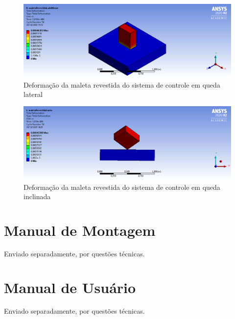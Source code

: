 \begin{apendicesenv}
\begin{figure}[htb]
    \centering
    \includegraphics[width=1.0\textwidth, angle=0]{figuras/estrutura_simulacaoImpacto/maletaRevestidaDeformacaoMenor.png}
    \caption{Deformação da maleta revestida do sistema de controle em queda lateral}
    \label{fig:simulacaoImpacto_35}
\end{figure}

\begin{figure}[htb]
    \centering
    \includegraphics[width=1.0\textwidth, angle=0]{figuras/estrutura_simulacaoImpacto/maletaRevestidaDeformacaoCanto.png}
    \caption{Deformação da maleta revestida do sistema de controle em queda inclinada}
    \label{fig:simulacaoImpacto_36}
\end{figure}






\chapter{Manual de Montagem}
\label{Manual_de_montagem}
%
Enviado separadamente, por questões técnicas.


\chapter{Manual de Usuário}
\label{Manual_de_usuario}
%
Enviado separadamente, por questões técnicas.


%


\end{apendicesenv}

